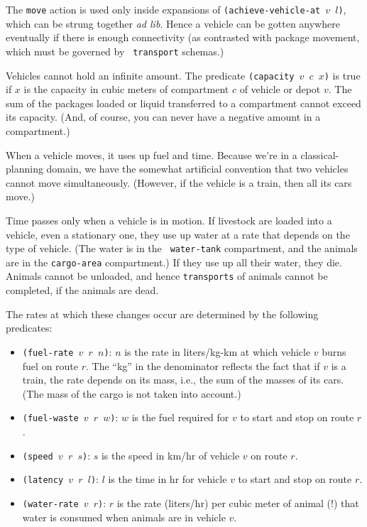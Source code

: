 \documentclass{article}
\begin{document}
The {\tt move}
action is used only inside expansions of {\tt (achieve-vehicle-at
$v$ $l$)}, which can be strung together {\it ad lib}.  Hence a vehicle
can be gotten anywhere eventually if there is enough connectivity (as
contrasted with package movement, which must be governed by {\tt
transport} schemas.)

Vehicles cannot hold an infinite amount.  The predicate 
{\tt (capacity $v$ $c$ $x$)} is true if $x$ is the capacity in cubic
meters of compartment $c$ of vehicle or depot $v$.  The sum of the
packages loaded or liquid transferred to a compartment cannot exceed
its capacity.  (And, of course, you can never have a negative amount
in a compartment.)

When a vehicle moves, it uses up fuel and time.  Because we're in a
classical-planning domain, 
we have the somewhat artificial convention that two vehicles cannot
move simultaneously.  (However, if the vehicle is a train, then all its cars
move.) 

Time passes only when a vehicle is in motion.  If livestock are loaded
into a vehicle, even a stationary one, they use up water at a rate
that depends on the type of vehicle.  (The water is in the {\tt
water-tank} compartment, and the animals are in the {\tt cargo-area}
compartment.)  If they use up all their water, they die.  Animals cannot
be unloaded, and hence {\tt transports} of animals cannot be
completed, if the animals are dead.

The rates at which these changes occur are determined by the following
predicates:
\begin{itemize}
\item {\tt (fuel-rate $v$ $r$ $n$)}: $n$ is the rate in liters/kg-km at which
vehicle $v$ burns fuel on route $r$.  The ``kg'' in the denominator
reflects the fact that if $v$ is a train, the rate depends on its
mass, i.e., the sum of the masses of its cars.  (The mass of the cargo
is not taken into account.)

\item {\tt (fuel-waste $v$ $r$ $w$)}: $w$ is the fuel required for $v$
to
start and stop on route $r$.

\item {\tt (speed $v$ $r$ $s$)}: $s$ is the speed in km/hr of vehicle
$v$ on route $r$.

\item {\tt (latency $v$ $r$ $l$)}: $l$ is the time in hr for vehicle
$v$ to start and stop on route $r$.

\item {\tt (water-rate $v$ $r$)}: $r$ is the rate (liters/hr) per
cubic meter of 
animal (!) that water is consumed when animals are in vehicle $v$.
\end{itemize}
\end{document}

